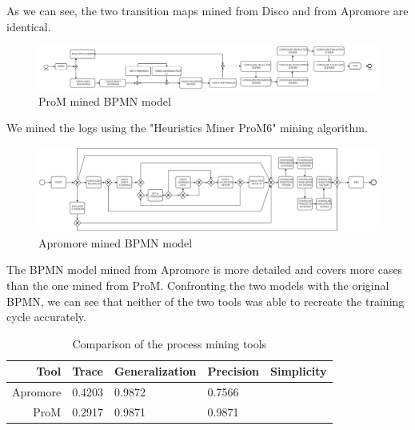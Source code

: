 As we can see, the two transition maps mined from Disco and from 
Apromore are identical.

\begin{figure}[H]
\centering
\includegraphics[width=\textwidth]{figures/prom_mined.pdf}
\caption{ProM mined BPMN model}
\label{fig:prom_mined}
\end{figure}

We mined the logs using the "Heuristics Miner ProM6" mining algorithm.

\begin{figure}[H]
\centering
\includegraphics[width=\textwidth]{figures/apromore_mined.pdf}
\caption{Apromore mined BPMN model}
\label{fig:apromore_mined}
\end{figure}

The BPMN model mined from Apromore is more detailed and
covers more cases than the one mined from ProM.
Confronting the two models with the original BPMN, we can see that neither
of the two tools was able to recreate the training cycle accurately.

\begin{table}[H]
\centering
\begin{tabular}{|r|l|l|l|l|}
\hline
\textbf{Tool} & \textbf{Trace} & \textbf{Generalization} & \textbf{Precision} & \textbf{Simplicity} \\
\hline
Apromore & 0.4203 & 0.9872 & 0.7566 & \\
\hline
ProM & 0.2917 & 0.9871 & 0.9871 & \\
\hline
\end{tabular}
\caption{Comparison of the process mining tools}
\label{tab:process_mining_comparison}
\end{table}